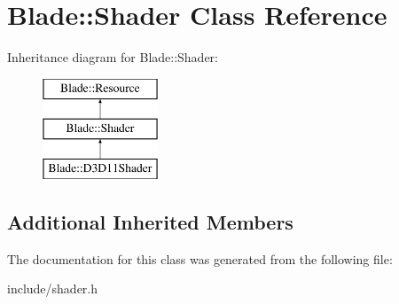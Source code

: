 \hypertarget{class_blade_1_1_shader}{}\section{Blade\+:\+:Shader Class Reference}
\label{class_blade_1_1_shader}
Inheritance diagram for Blade\+:\+:Shader\+:\begin{figure}[H]
\begin{center}
\leavevmode
\includegraphics[height=3.000000cm]{class_blade_1_1_shader}
\end{center}
\end{figure}
\subsection*{Additional Inherited Members}


The documentation for this class was generated from the following file\+:\begin{DoxyCompactItemize}
\item 
include/shader.\+h\end{DoxyCompactItemize}
